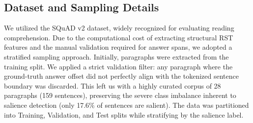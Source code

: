 \documentclass[11pt,a4paper]{article}
\begin{document}
\subsection{Dataset and Sampling Details}
We utilized the SQuAD v2 dataset, widely recognized for evaluating reading comprehension. Due to the computational cost of extracting structural RST features and the manual validation required for answer spans, we adopted a stratified sampling approach.
Initially, paragraphs were extracted from the training split. We applied a strict validation filter: any paragraph where the ground-truth answer offset did not perfectly align with the tokenized sentence boundary was discarded. This left us with a highly curated corpus of 28 paragraphs (159 sentences), preserving the severe class imbalance inherent to salience detection (only 17.6\% of sentences are salient). The data was partitioned into Training, Validation, and Test splits while stratifying by the salience label.

\begin{table}[h!]
\centering
{}
\caption{Dataset statistics detailing the curated SQuAD corpus. \textit{\scriptsize (Source: \texttt{shared/results/transformer\_split\_report.json} \& \texttt{shared/data/cleaned\_sample\_manifest.json})}}
\label{tab:dataset_stats}
\end{table}
\end{document}
